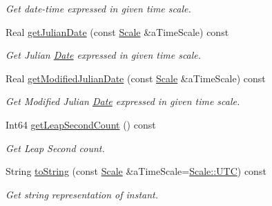 \begin{DoxyCompactItemize}
\begin{DoxyCompactList}\small\item\em Get date-\/time expressed in given time scale. \end{DoxyCompactList}\item 
Real \hyperlink{classostk_1_1physics_1_1time_1_1_instant_a71b3a5992123fddb3a3539dc99df66c1}{get\+Julian\+Date} (const \hyperlink{namespaceostk_1_1physics_1_1time_adf23d37bd8641fb76a0e98ab46a70df7}{Scale} \&a\+Time\+Scale) const
\begin{DoxyCompactList}\small\item\em Get Julian \hyperlink{classostk_1_1physics_1_1time_1_1_date}{Date} expressed in given time scale. \end{DoxyCompactList}\item 
Real \hyperlink{classostk_1_1physics_1_1time_1_1_instant_aeaaf152c806c5f98ad03933ede05fe2d}{get\+Modified\+Julian\+Date} (const \hyperlink{namespaceostk_1_1physics_1_1time_adf23d37bd8641fb76a0e98ab46a70df7}{Scale} \&a\+Time\+Scale) const
\begin{DoxyCompactList}\small\item\em Get Modified Julian \hyperlink{classostk_1_1physics_1_1time_1_1_date}{Date} expressed in given time scale. \end{DoxyCompactList}\item 
Int64 \hyperlink{classostk_1_1physics_1_1time_1_1_instant_aceab87ef79e6f5d1438ac78e11bdcd6f}{get\+Leap\+Second\+Count} () const
\begin{DoxyCompactList}\small\item\em Get Leap Second count. \end{DoxyCompactList}\item 
String \hyperlink{classostk_1_1physics_1_1time_1_1_instant_a710ff6dec3b97f4e10bcfeae6335eb56}{to\+String} (const \hyperlink{namespaceostk_1_1physics_1_1time_adf23d37bd8641fb76a0e98ab46a70df7}{Scale} \&a\+Time\+Scale=\hyperlink{namespaceostk_1_1physics_1_1time_adf23d37bd8641fb76a0e98ab46a70df7a9234324ddf6b4176b57d803a925b7961}{Scale\+::\+U\+TC}) const
\begin{DoxyCompactList}\small\item\em Get string representation of instant. \end{DoxyCompactList}\end{DoxyCompactItemize}
